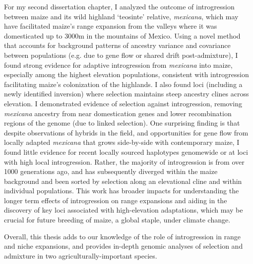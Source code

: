 	For my second dissertation chapter, I analyzed the outcome of introgression between maize and its wild highland ‘teosinte' relative, \textit{mexicana},
	which may have facilitated maize’s range expansion from the valleys where it was domesticated up to 3000m in the mountains of Mexico.
	Using a novel method that accounts for background patterns of ancestry variance and covariance between populations
	(e.g. due to gene flow or shared drift post-admixture), I found strong evidence for adaptive introgression from \textit{mexicana} into maize,
	especially among the highest elevation populations, consistent with introgression facilitating maize’s colonization of the highlands.
	I also found loci (including a newly identified inversion) where selection maintains steep ancestry clines across elevation.
	I demonstrated evidence of selection against introgression,
	removing \textit{mexicana} ancestry from near domestication genes and lower recombination regions of the genome (due to linked selection).
	One surprising finding is that despite observations of hybrids in the field,
	and opportunities for gene flow from locally adapted \textit{mexicana} that grows side-by-side with contemporary maize,
	I found little evidence for recent locally sourced haplotypes genomewide or at loci with high local introgression.
	Rather, the majority of introgression is from over 1000 generations ago,
	and has subsequently diverged within the maize background and been sorted by selection along an elevational cline and within individual populations.
	This work has broader impacts for understanding the longer term effects of introgression on range expansions and aiding in the discovery of key loci associated with high-elevation adaptations,
	which may be crucial for future breeding of maize, a global staple, under climate change.
	
	Overall, this thesis adds to our knowledge of the role of introgression in range and niche expansions,
	and provides in-depth genomic analyses of selection and admixture in two agriculturally-important species.
